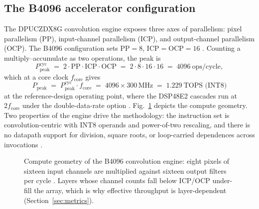 \documentclass[onecolumn,journal]{IEEEtran}
\newcommand{\Ppeak}{P_{\mathrm{peak}}}
\begin{document}
\subsection{The B4096 accelerator configuration}\label{sec:dpu}
The DPUCZDX8G convolution engine exposes three axes of parallelism: pixel parallelism
(PP), input-channel parallelism (ICP), and output-channel parallelism (OCP). The B4096
configuration sets $\mathrm{PP}=8$, $\mathrm{ICP}=\mathrm{OCP}=16$
\cite{amd_pg338}. Counting a multiply--accumulate as two operations, the peak is
\begin{equation}
\Ppeak^{\mathrm{cyc}} \;=\; 2\cdot \mathrm{PP}\cdot \mathrm{ICP}\cdot \mathrm{OCP}
\;=\; 2\cdot 8\cdot 16\cdot 16 \;=\; 4096~\text{ops/cycle},
\label{eq:peakcyc}
\end{equation}
which at a core clock $f_{\mathrm{core}}$ gives
\begin{equation}
\Ppeak \;=\; \Ppeak^{\mathrm{cyc}} \cdot f_{\mathrm{core}}
\;=\; 4096 \times 300\,\text{MHz} \;=\; 1.229~\text{TOPS (INT8)}
\label{eq:peak}
\end{equation}
at the reference-design operating point, where the DSP48E2 cascades run at
$2f_{\mathrm{core}}$ under the double-data-rate option \cite{amd_pg338}.
Fig.~\ref{fig:dpugeom} depicts the compute geometry. Two properties of the engine drive
the methodology: the instruction set is convolution-centric with INT8 operands and
power-of-two rescaling, and there is no datapath support for division, square roots, or
loop-carried dependences across invocations \cite{amd_pg338,amd_ug1414}.

\begin{figure}[t]
\centering
{}
\caption{Compute geometry of the B4096 convolution engine: eight pixels of sixteen
input channels are multiplied against sixteen output filters per cycle
\cite{amd_pg338}. Layers whose channel counts fall below ICP/OCP under-fill the array,
which is why effective throughput is layer-dependent
(Section~\ref{sec:metrics}).}
\label{fig:dpugeom}
\end{figure}
\end{document}
